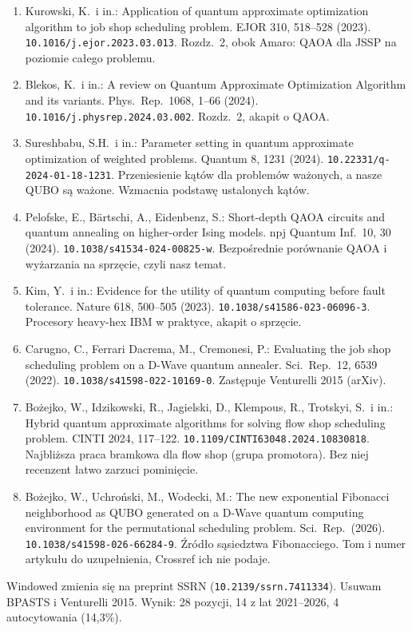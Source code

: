 \documentclass[11pt,a4paper]{article}
\begin{document}
\begin{enumerate}[nosep,label=N\arabic*.]
\item Kurowski, K.\ i in.: Application of quantum approximate optimization algorithm to job shop scheduling problem. EJOR 310, 518--528 (2023). \texttt{10.1016/j.ejor.2023.03.013}. Rozdz.~2, obok Amaro: QAOA dla JSSP na poziomie całego problemu.
\item Blekos, K.\ i in.: A review on Quantum Approximate Optimization Algorithm and its variants. Phys.\ Rep.\ 1068, 1--66 (2024). \texttt{10.1016/j.physrep.2024.03.002}. Rozdz.~2, akapit o QAOA.
\item Sureshbabu, S.H.\ i in.: Parameter setting in quantum approximate optimization of weighted problems. Quantum 8, 1231 (2024). \texttt{10.22331/q-2024-01-18-1231}. Przeniesienie kątów dla problemów ważonych, a nasze QUBO są ważone. Wzmacnia podstawę ustalonych kątów.
\item Pelofske, E., Bärtschi, A., Eidenbenz, S.: Short-depth QAOA circuits and quantum annealing on higher-order Ising models. npj Quantum Inf.\ 10, 30 (2024). \texttt{10.1038/s41534-024-00825-w}. Bezpośrednie porównanie QAOA i wyżarzania na sprzęcie, czyli nasz temat.
\item Kim, Y.\ i in.: Evidence for the utility of quantum computing before fault tolerance. Nature 618, 500--505 (2023). \texttt{10.1038/s41586-023-06096-3}. Procesory heavy-hex IBM w praktyce, akapit o sprzęcie.
\item Carugno, C., Ferrari Dacrema, M., Cremonesi, P.: Evaluating the job shop scheduling problem on a D-Wave quantum annealer. Sci.\ Rep.\ 12, 6539 (2022). \texttt{10.1038/s41598-022-10169-0}. Zastępuje Venturelli 2015 (arXiv).
\item Bożejko, W., Idzikowski, R., Jagielski, D., Klempous, R., Trotskyi, S.\ i in.: Hybrid quantum approximate algorithms for solving flow shop scheduling problem. CINTI 2024, 117--122. \texttt{10.1109/CINTI63048.2024.10830818}. Najbliższa praca bramkowa dla flow shop (grupa promotora). Bez niej recenzent łatwo zarzuci pominięcie.
\item Bożejko, W., Uchroński, M., Wodecki, M.: The new exponential Fibonacci neighborhood as QUBO generated on a D-Wave quantum computing environment for the permutational scheduling problem. Sci.\ Rep.\ (2026). \texttt{10.1038/s41598-026-66284-9}. Źródło sąsiedztwa Fibonacciego. Tom i numer artykułu do uzupełnienia, Crossref ich nie podaje.
\end{enumerate}
Windowed zmienia się na preprint SSRN (\texttt{10.2139/ssrn.7411334}). Usuwam BPASTS i Venturelli 2015. Wynik: 28 pozycji, 14 z lat 2021--2026, 4 autocytowania (14,3\%).
\end{document}
